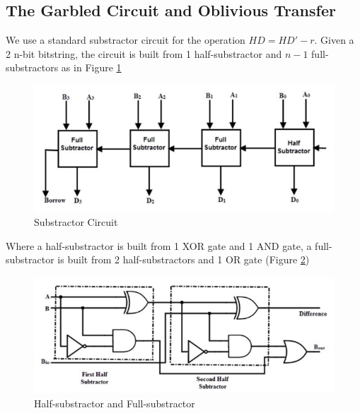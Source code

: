 

\subsection{The Garbled Circuit and Oblivious Transfer}
We use a standard substractor circuit for the operation \(HD = HD' - r\). Given a 2
n-bit bitstring, the circuit is built from 1 half-substractor and \(n-1\)
full-substractors as in Figure \ref{fig:substractor}

\begin{figure}[htbp!] 
  \centering    
  \includegraphics[width=1.0\textwidth]{Chapter7/Figs/Raster/subCircuit}
  \caption{Substractor Circuit}
  \label{fig:substractor}
\end{figure}

Where a half-substractor is built from 1 XOR gate and 1 AND gate, a full-substractor is built from 2 half-substractors and 1 OR gate (Figure \ref{fig:fullSubstractor})

\begin{figure}[htbp!] 
  \centering    
  \includegraphics[width=1.0\textwidth]{Chapter7/Figs/Raster/fullSubstractor}
  \caption{Half-substractor and Full-substractor}
  \label{fig:fullSubstractor}
\end{figure}

